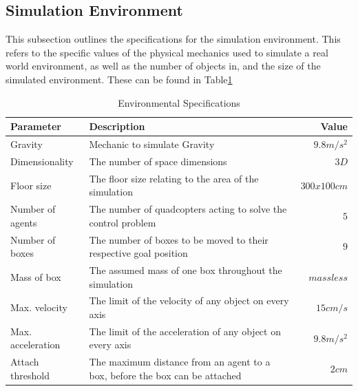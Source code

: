 \subsection{Simulation Environment}
\label{sec:environment}

This subsection outlines the specifications for the simulation environment. This refers to the specific values of the physical mechanics used to simulate a real world environment, as well as the number of objects in, and the size of the simulated environment. These can be found in Table\ref{tab:env_specs}

\begin{table}[H]
\centering
\begin{tabularx}{1\textwidth}{l@{ }Xr}
\toprule
\textbf{Parameter}   & \textbf{Description}                                                        & \textbf{Value} \\ \midrule
Gravity		       & Mechanic to simulate Gravity                                                  & ${9.8m/s^2}$  \\
Dimensionality		 & The number of space dimensions               							   & ${3D}$          \\
Floor size			 & The floor size relating to the area of the simulation				       & ${300x100cm}$          \\
Number of agents     & The number of quadcopters acting to solve the control problem               & ${5}$          \\
Number of boxes      & The number of boxes to be moved to their respective goal position           & ${9}$              \\
Mass of box          & The assumed mass of one box throughout the simulation                       & ${massless}$       \\
Max. velocity        & The limit of the velocity of any object on every axis                          & ${15cm/s}$         \\
Max. acceleration    & The limit of the acceleration of any object on every axis                      & ${9.8m/s^2}$       \\
Attach threshold     & The maximum distance from an agent to a box, before the box can be attached & ${2cm}$           \\ \bottomrule
\end{tabularx}
\caption{Environmental Specifications}
\label{tab:env_specs}
\end{table}

